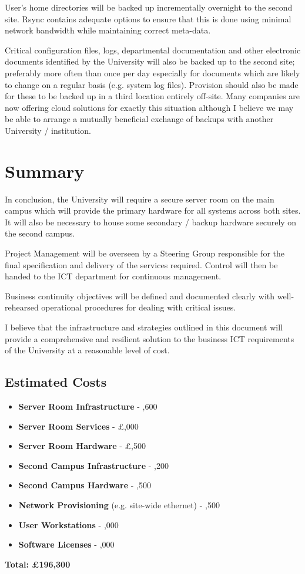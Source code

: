 \documentclass[a4paper, twoside]{article}
\begin{document}
User's home directories will be backed up incrementally overnight to the second
site. Rsync contains adequate options to ensure that this is done using minimal
network bandwidth while maintaining correct meta-data.

Critical configuration files, logs, departmental documentation and other
electronic documents identified by the University will also be backed up to the
second site; preferably more often than once per day especially for documents
which are likely to change on a regular basis (e.g. system log files). Provision
should also be made for these to be backed up in a third location entirely
off-site. Many companies are now offering cloud solutions for exactly this
situation although I believe we may be able to arrange a mutually beneficial
exchange of backups with another University / institution.

\clearpage
\section{Summary}
In conclusion, the University will require a secure server room on the main
campus which will provide the primary hardware for all systems across both
sites. It will also be necessary to house some secondary / backup hardware
securely on the second campus.

Project Management will be overseen by a Steering Group responsible for the
final specification and delivery of the services required. Control will then be
handed to the ICT department for continuous management.

Business continuity objectives will be defined and documented clearly with
well-rehearsed operational procedures for dealing with critical issues.

I believe that the infrastructure and strategies outlined in this document will
provide a comprehensive and resilient solution to the business ICT requirements
of the University at a reasonable level of cost.

\subsection{Estimated Costs}
\begin{itemize}
\item{{\bf Server Room Infrastructure} - ,600}
\item{{\bf Server Room Services} - £,000}
\item{{\bf Server Room Hardware} - £,500}
\item{{\bf Second Campus Infrastructure} - ,200}
\item{{\bf Second Campus Hardware} - ,500}
\item{{\bf Network Provisioning} (e.g. site-wide ethernet) - ,500}
\item{{\bf User Workstations} - ,000}
\item{{\bf Software Licenses} - ,000}
\end{itemize}
{\bf Total: £196,300}
\end{document}

